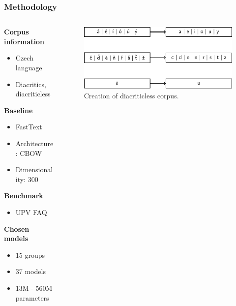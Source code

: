 \documentclass{beamer}
\begin{document}
\begin{frame}
  \frametitle{Methodology}
  \begin{columns}[onlytextwidth]
    \begin{column}{0.4\textwidth}
      \textcolor{cvut_navy}{\textbf{Corpus information}}
      \begin{itemize}
        \item Czech language
        \item Diacritics, diacriticless
      \end{itemize}
      \textcolor{cvut_navy}{\textbf{Baseline}}
      \begin{itemize}
        \item FastText
        \item Architecture: CBOW
        \item Dimensionality: 300
      \end{itemize}
      \textcolor{cvut_navy}{\textbf{Benchmark}}
      \begin{itemize}
        \item UPV FAQ
      \end{itemize}
      \textcolor{cvut_navy}{\textbf{Chosen models}}
      \begin{itemize}
        \item 15 groups
        \item 37 models
        \item 13M - 560M parameters
      \end{itemize}
    \end{column}
    \begin{column}{0.6\textwidth}
      \begin{figure}
        \includegraphics[scale=0.75]{src/fig/pdfs/tikz/diacritics_diacriticless.pdf}
        \caption{Creation of diacriticless corpus.}
      \end{figure}     
    \end{column}
  \end{columns}
\end{frame}
\end{document}
